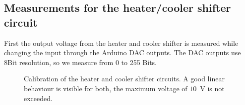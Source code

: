 \documentclass[12pt]{scrartcl}
\begin{document}
      \subsection{Measurements for the heater/cooler shifter circuit}
        First the output voltage from the heater and cooler shifter is measured while
        changing the input through the Arduino DAC outputs. The DAC outputs use
        8Bit resolution, so we measure from 0 to 255 Bits.
        \begin{figure}[h]
          \caption{Calibration of the heater and cooler shifter circuits. A good
          linear behaviour is visible for both, the maximum voltage of $10$~V is
          not exceeded.}
          \label{fig8}
        \end{figure}
\end{document}
